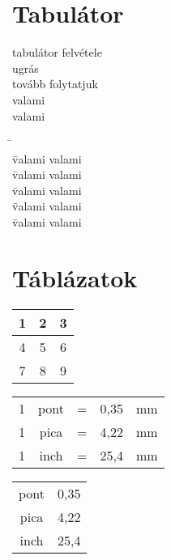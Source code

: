 \documentclass[10pt]{article}
\begin{document}
\section{Tabulátor}
\begin{tabbing}
tabulátor felvétele \= \\
\> ugrás \= \\
\>\> tovább folytatjuk\\

\hspace{1cm}
valami\\
\vspace{1cm}
valami\\
\end{tabbing}

\begin{tabbing}
\hspace{2cm} \= \hspace{8cm}
\= \\
\= valami \> valami \\
\= valami \> valami \\
\= valami \> valami \\
\= valami \> valami \\
\= valami \> valami \\

\end{tabbing}
\section{Táblázatok}
\begin{tabular}{|c|c|c|}
\hline \hline
1 & 2 & 3 \\ \hline
4 & 5 & 6 \\ \hline
7 & 8 & 9 \\
\hline \hline
\end{tabular}
\vspace{1cm}

\begin{tabular}{ccccc}
1 & pont & = & 0,35 & mm \\
1 & pica & = & 4,22 & mm \\
1 & inch & = & 25,4 & mm \\
\end{tabular}
\vspace{1cm}

\begin{tabular}{@{1 } c @{ = }c @{ mm }}

pont & 0,35 \\
pica & 4,22 \\
inch & 25,4 \\
\end{tabular}
\vspace{1cm}
\end{document}
